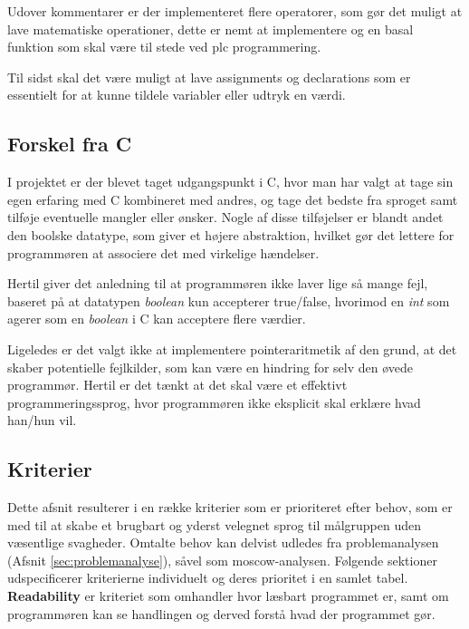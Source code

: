 Udover kommentarer er der implementeret flere operatorer, som gør det muligt at lave matematiske operationer, dette er nemt at implementere og en basal funktion som skal være til stede ved \gls{plc} programmering.

Til sidst skal det være muligt at lave assignments og declarations som er essentielt for at kunne tildele variabler eller udtryk en værdi.

\subsection{Forskel fra C}
\label{sec:forskelfrac}
I projektet er der blevet taget udgangspunkt i C, hvor man har valgt at tage sin egen erfaring med C kombineret med andres, og tage det bedste fra sproget samt tilføje eventuelle mangler eller ønsker.
Nogle af disse tilføjelser er blandt andet den boolske datatype, som giver et højere abstraktion, hvilket gør det  lettere for programmøren at associere det med virkelige hændelser.

Hertil giver det anledning til at programmøren ikke laver lige så mange fejl, baseret på at datatypen \textit{boolean} kun accepterer true/false, hvorimod en \textit{int} som agerer som en \textit{boolean} i C kan acceptere flere værdier.

Ligeledes er det valgt ikke at implementere pointeraritmetik af den grund, at det skaber potentielle fejlkilder, som kan være en hindring for selv den øvede programmør. Hertil er det tænkt at det skal være et effektivt programmeringssprog, hvor programmøren ikke eksplicit skal erklære hvad han/hun vil.

\subsection{Kriterier}
Dette afsnit resulterer i en række kriterier som er prioriteret efter behov, som er med til at skabe et brugbart og yderst velegnet sprog til målgruppen uden væsentlige svagheder. Omtalte behov kan delvist udledes fra problemanalysen (Afsnit \ref{sec:problemanalyse}), såvel som \gls{moscow}-analysen.
Følgende sektioner udspecificerer kriterierne individuelt og deres prioritet i en samlet tabel.\\

\noindent\textbf{Readability} er kriteriet som omhandler hvor læsbart programmet er, samt om programmøren kan se handlingen og derved forstå hvad der programmet gør.

